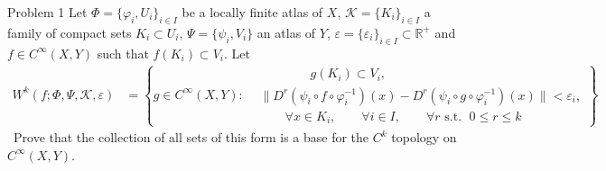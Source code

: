\vspace{1em}
\iffalse
\begin{defn}[\(C^k\) topology]\leavevmode
It's a topology on \(C^\infty (X,Y)\) generated by the subsets
\[M_k(U):=\left\{ f \in C^\infty(X,Y) : j^kf \in U  \right\}\]
For any open subset \(U \subset J^k(X,Y)\).

\textbf{Idea.} Put a topology on an infinite-dimensional space coming from finite-dimensional approximations. Infinite-dimensional is a whole Taylor series, a smooth function, and finite dimensional is a finite polynomial, a jet!

But there's something missing! The point \(x\). Because a jet is not a global linear approximation right? So the real definition is
\[M_k(U)=\{f \in C^\infty (X,Y): j^kf(x) \in U \forall x \in X\}\]
But how is the topology on \(J^k(X,Y)\)? Or better yet, what is \(J^k(X,Y)\)? Points are functions from \(X\) to \(Y\) that map \(x\) to \(y\) and agree up to degree \(k\) on their derivative. But it's better to think of it as a bundle (over \(X, Y\) or \(X \times Y\)):  a function gives for every point of \(X\) a \(k\)-jet based on the point; so a thing that is in the fiber \(J^k(X,Y)_{x,f(x)}\). The topology of this bundle is given by local charts using that the \(k\)-polynomials are a vector space.

So, an open set \(U \subset J^k(X,Y)\) is (a union of) coordinate charts of the kind explained above. So you can just think that there is a natural way of saying how close or far away are jets from each other, because jets are simple.
\end{defn}
\fi
\begin{thing1}{Problem 1}\label{p:1}\leavevmode
Let  \(\Phi=\{\varphi_i,U_i\}_{i \in I}\) be a locally finite atlas of \(X\), \(\mathcal{K}=\{K_i\}_{i \in I}\) a family of compact sets \(K_i \subset U_i\), \(\Psi=\{\psi_i,V_i\}\) an atlas of \(Y\), \(\varepsilon=\{\varepsilon_i\}_{i \in I}\subset \mathbb{R}^+\) and \(f\in C^\infty(X,Y)\) such that \(f (K_i) \subset V_i\). Let
\begin{align*}
W^k(f;\Phi,\Psi,\mathcal{K},\varepsilon)&=\left\{ g \in C^\infty(X,Y)  :\begin{aligned}
&\qquad  \qquad g(K_i)\subset V_i,\\& \|D^r(\psi_i \circ f \circ \varphi_i^{-1})(x)-D^r(\psi_i \circ g \circ \varphi_i^{-1})(x)\|<\varepsilon_i,\\
&\qquad \forall x \in K_i,\qquad \forall i \in I, \qquad \forall r\text{ s.t. } \; 0 \leq r\leq k
\end{aligned}\right\}
\end{align*}\
Prove that the collection of all sets of this form is a base for the \(C^k\) topology on \(C^\infty(X,Y)\).
\end{thing1}

